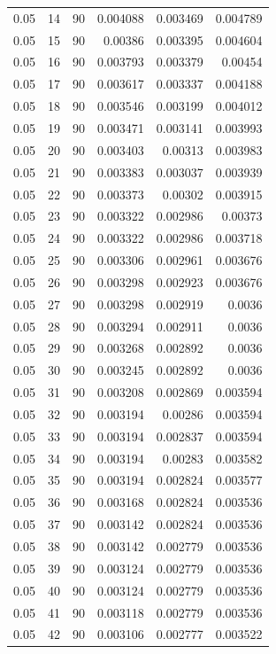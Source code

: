 \begin{tabular}{rrrrrr}
0.05 & 14 & 90 & 0.004088 & 0.003469 & 0.004789 \\
0.05 & 15 & 90 & 0.00386 & 0.003395 & 0.004604 \\
0.05 & 16 & 90 & 0.003793 & 0.003379 & 0.00454 \\
0.05 & 17 & 90 & 0.003617 & 0.003337 & 0.004188 \\
0.05 & 18 & 90 & 0.003546 & 0.003199 & 0.004012 \\
0.05 & 19 & 90 & 0.003471 & 0.003141 & 0.003993 \\
0.05 & 20 & 90 & 0.003403 & 0.00313 & 0.003983 \\
0.05 & 21 & 90 & 0.003383 & 0.003037 & 0.003939 \\
0.05 & 22 & 90 & 0.003373 & 0.00302 & 0.003915 \\
0.05 & 23 & 90 & 0.003322 & 0.002986 & 0.00373 \\
0.05 & 24 & 90 & 0.003322 & 0.002986 & 0.003718 \\
0.05 & 25 & 90 & 0.003306 & 0.002961 & 0.003676 \\
0.05 & 26 & 90 & 0.003298 & 0.002923 & 0.003676 \\
0.05 & 27 & 90 & 0.003298 & 0.002919 & 0.0036 \\
0.05 & 28 & 90 & 0.003294 & 0.002911 & 0.0036 \\
0.05 & 29 & 90 & 0.003268 & 0.002892 & 0.0036 \\
0.05 & 30 & 90 & 0.003245 & 0.002892 & 0.0036 \\
0.05 & 31 & 90 & 0.003208 & 0.002869 & 0.003594 \\
0.05 & 32 & 90 & 0.003194 & 0.00286 & 0.003594 \\
0.05 & 33 & 90 & 0.003194 & 0.002837 & 0.003594 \\
0.05 & 34 & 90 & 0.003194 & 0.00283 & 0.003582 \\
0.05 & 35 & 90 & 0.003194 & 0.002824 & 0.003577 \\
0.05 & 36 & 90 & 0.003168 & 0.002824 & 0.003536 \\
0.05 & 37 & 90 & 0.003142 & 0.002824 & 0.003536 \\
0.05 & 38 & 90 & 0.003142 & 0.002779 & 0.003536 \\
0.05 & 39 & 90 & 0.003124 & 0.002779 & 0.003536 \\
0.05 & 40 & 90 & 0.003124 & 0.002779 & 0.003536 \\
0.05 & 41 & 90 & 0.003118 & 0.002779 & 0.003536 \\
0.05 & 42 & 90 & 0.003106 & 0.002777 & 0.003522 \\

\end{tabular}
